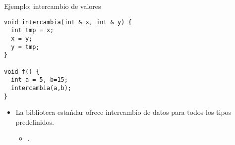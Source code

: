 \begin{frame}[fragile]{Ejemplo: intercambio de valores}
\begin{lstlisting}
void intercambia(int & x, int & y) {
  int tmp = x;
  x = y;
  y = tmp;
}

void f() {
  int a = 5, b=15;
  intercambia(a,b);
}
\end{lstlisting}
\begin{itemize}
  \item La biblioteca estańdar ofrece intercambio de datos para 
        todos los tipos predefinidos.
    \begin{itemize}
      \item {}.
    \end{itemize}
\end{itemize}
\end{frame}
